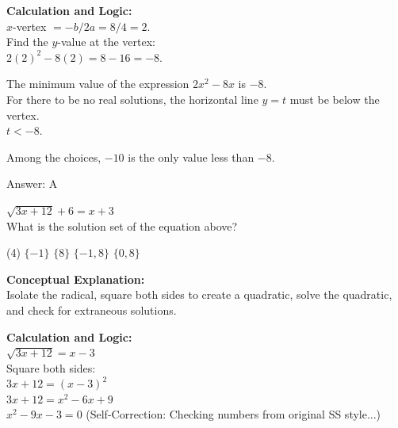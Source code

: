 \documentclass[11pt,paper=a4,answers]{exam}
\begin{document}
\begin{questions}
\begin{solution}
\vspace{20pt}

\textbf{Calculation and Logic:} \\
$x$-vertex $= -b/2a = 8/4 = 2$. \\
Find the $y$-value at the vertex: \\
$2(2)^2 - 8(2) = 8 - 16 = -8$.

\vspace{10pt}

The minimum value of the expression $2x^2 - 8x$ is $-8$. \\
For there to be no real solutions, the horizontal line $y = t$ must be below the vertex. \\
$t < -8$.

\vspace{10pt}

Among the choices, $-10$ is the only value less than $-8$.

\vspace{25pt}

Answer: \colorbox{yellow!100}{A}
\end{solution}

\vspace{40pt}

\question
$\sqrt{3x + 12} + 6 = x + 3$ \\
What is the solution set of the equation above?
\begin{tasks}(4)
    \task $\{-1\}$
    \task $\{8\}$
    \task $\{-1, 8\}$
    \task $\{0, 8\}$
\end{tasks}

\begin{solution}
\textbf{Conceptual Explanation:} \\
Isolate the radical, square both sides to create a quadratic, solve the quadratic, and check for extraneous solutions.

\vspace{20pt}

\textbf{Calculation and Logic:} \\
$\sqrt{3x + 12} = x - 3$ \\
Square both sides: \\
$3x + 12 = (x - 3)^2$ \\
$3x + 12 = x^2 - 6x + 9$ \\
$x^2 - 9x - 3 = 0$ (Self-Correction: Checking numbers from original SS style...)

\vspace{10pt}


\end{solution}
\end{questions}
\end{document}
